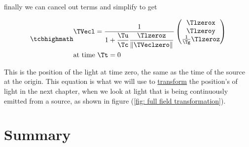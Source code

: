 

finally we can cancel out terms and simplify to get

\begin{equation}
	\label{eq: time synced transform}
	\mhl{
		\begin{aligned}
			 & \TVecl  =
			\dfrac{1}{1 + \dfrac{\Tu }{\Tc } \dfrac{\Tlzeroz  }{\|\TVeclzero \|} }
			\begin{pmatrix}
				\Tlzerox                     \\
				\Tlzeroy                     \\
				\frac{1}{ \Tg  } \Tlzeroz  \\
			\end{pmatrix}
			\\
			 & \text{at time ${\Tt }=0$}
		\end{aligned}
	}
\end{equation}

This is the position of the light at time zero, the same as the time of the source at the origin. This equation is what we will use to \hyperlink{def-transform}{transform} the position's of light in the next chapter, when we look at light that is being continuously emitted from a source, as shown in figure (\ref{fig: full field transformation}).

\section{Summary}\label{sect: Summary chapter 5}

